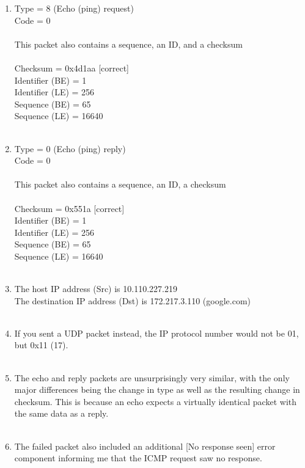 \documentclass[12pt]{article}
\begin{document}
\begin{enumerate}
\begin{enumerate}
			\item Type = 8 (Echo (ping) request)\\
			Code = 0\\
			\\
			This packet also contains a sequence, an ID, and a checksum\\
			\\
			Checksum = 0x4d1aa [correct]\\
			Identifier (BE) = 1\\
			Identifier (LE) = 256\\
			Sequence (BE) = 65\\
			Sequence (LE) = 16640\\
			\\
			\item Type = 0 (Echo (ping) reply)\\
			Code = 0\\
			\\
			This packet also contains a sequence, an ID, a checksum\\
			\\
			Checksum = 0x551a [correct]\\
			Identifier (BE) = 1\\
			Identifier (LE) = 256\\
			Sequence (BE) = 65\\
			Sequence (LE) = 16640\\
			\\
			\item The host IP address (Src) is 10.110.227.219\\
			The destination IP address (Dst) is 172.217.3.110 (google.com)\\
			\\
			\item If you sent a UDP packet instead, the IP protocol number would not be 01, but 0x11 (17).\\
			\\
			\item The echo and reply packets are unsurprisingly very similar, with the only major differences being the change in type as well as the resulting change in checksum. This is because an echo expects a virtually identical packet with the same data as a reply.\\
			\\
			\item The failed packet also included an additional [No response seen] error component informing me that the ICMP request saw no response.

		\end{enumerate}

\end{enumerate}
\end{document}
